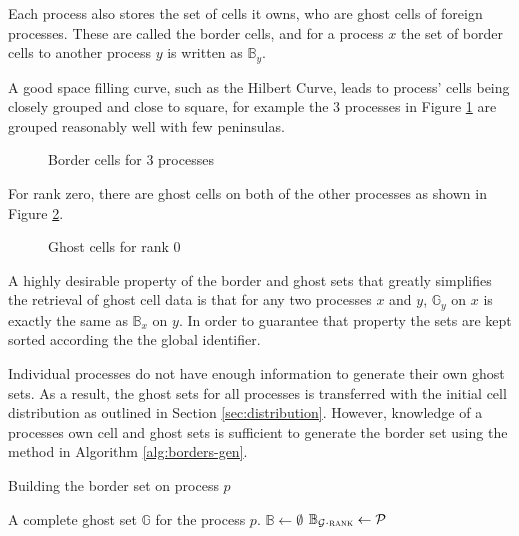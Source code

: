 \documentclass{IIBproject}
\newcommand{\vect} [1] {\bm{#1}}
\newcommand{\acc}{{\mkern 0.5mu\cdot\mkern 0.5mu}}
\numberwithin{figure}{section}
\begin{document}
        Each process also stores the set of cells it owns, who are ghost cells of foreign processes. These are called the border cells, and for a process $x$ the set of border cells to another process $y$ is written as $\mathbb{B}_y$.

        A good space filling curve, such as the Hilbert Curve, leads to process' cells being closely grouped and close to square, for example the 3 processes in Figure \ref{fig:borderline} are grouped reasonably well with few peninsulas.

        \begin{figure}[H]
            
            \caption{Border cells for 3 processes}
            \label{fig:borderline}
        \end{figure}

        For rank zero, there are ghost cells on both of the other processes as shown in Figure \ref{fig:borders-r0}.

        \begin{figure}[H]
            
            \caption{Ghost cells for rank 0}
            \label{fig:borders-r0}
        \end{figure}

        A highly desirable property of the border and ghost sets that greatly simplifies the retrieval of ghost cell data is that for any two processes $x$ and $y$, $\mathbb{G}_y$ on $x$ is exactly the same as $\mathbb{B}_x$ on $y$. In order to guarantee that property the sets are kept sorted according the the global identifier.

        Individual processes do not have enough information to generate their own ghost sets. As a result, the ghost sets for all processes is transferred with the initial cell distribution as outlined in Section \ref{sec:distribution}. However, knowledge of a processes own cell and ghost sets is sufficient to generate the border set using the method in Algorithm \ref{alg:borders-gen}.

        \begin{algorithm}[H]
            \caption{Building the border set on process $p$}
            \label{alg:borders-gen}

            \begin{algorithmic}
                \Require A complete ghost set $\mathbb{G}$ for the process $p$.
                \Statex
                \State $\mathbb{B} \gets \emptyset$
                    \ForEach {poisson neighbour $\mathcal{P} \in \mathcal{G}\acc\vect{\mathcal{P}}$}
                        \If {$\mathcal{P}\acc\textproc{rank} = p$}
                            \State $\mathbb{B}_{\mathcal{G}\acc\textproc{rank}} \gets \mathcal{P}$
                        \EndIf
                    \EndFor
                \EndFor
            \end{algorithmic}
        \end{algorithm}
\end{document}
